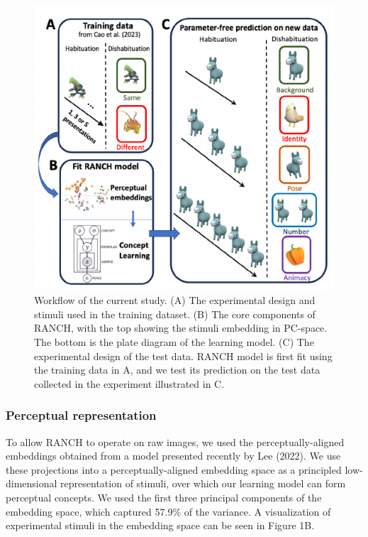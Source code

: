 \documentclass[10pt, letterpaper]{article}
\newenvironment{CodeChunk}{}{}
\begin{document}
\begin{CodeChunk}
\begin{figure}[t]

{\centering \includegraphics{figs/design_fig-1} 

}

\caption[Workflow of the current study]{Workflow of the current study. (A) The experimental design and stimuli used in the training dataset. (B) The core components of RANCH, with the top showing the stimuli embedding in PC-space. The bottom is the plate diagram of the learning model. (C) The experimental design of the test data. RANCH model is first fit using the training data in A, and we test its prediction on the test data collected in the experiment illustrated in C.}\label{fig:design_fig}
\end{figure}
\end{CodeChunk}

\hypertarget{perceptual-representation}{%
\subsubsection{Perceptual
representation}\label{perceptual-representation}}

To allow RANCH to operate on raw images, we used the
perceptually-aligned embeddings obtained from a model presented recently
by Lee (2022). We use these projections into a perceptually-aligned
embedding space as a principled low-dimensional representation of
stimuli, over which our learning model can form perceptual concepts. We
used the first three principal components of the embedding space, which
captured 57.9\% of the variance. A visualization of experimental stimuli
in the embedding space can be seen in Figure 1B.
\end{document}
